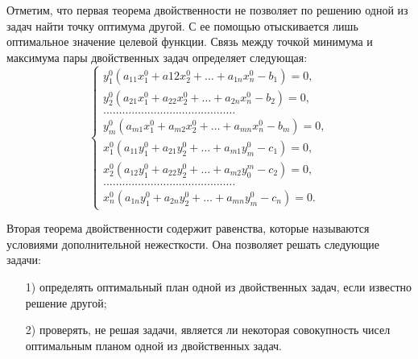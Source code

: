 Отметим, что первая теорема двойственности не позволяет по решению одной из задач найти точку оптимума другой. С ее помощью отыскивается лишь оптимальное значение целевой функции. Связь между точкой минимума и максимума пары двойственных задач определяет следующая:\\

\[
\begin{cases}
y^0_1\left(a_{11}x^0_1 + a{12}x^0_2 + \ldots + a_{1n}x^0_n - b_1\right) = 0, \\
y^0_2\left(a_{21}x^0_1 + a_{22}x^0_2 + \ldots + a_{2n}x^0_n - b_2\right) = 0, \\
\ldots\ldots\ldots\ldots\ldots\ldots\ldots\ldots\ldots\ldots\ldots\ldots\ldots\ldots \\
y^0_m\left(a_{m1}x^0_1 + a_{m2}x^0_2 + \ldots + a_{mn}x^0_n - b_m\right) = 0, \\
x^0_1\left(a_{11}y^0_1 + a_{21}y^0_2 + \ldots + a_{m1}y^0_m - c_1\right) = 0, \\
x^0_2\left(a_{12}y^0_1 + a_{22}y^0_2 + \ldots + a_{m2}y^m_0 - c_2\right) = 0, \\
\ldots\ldots\ldots\ldots\ldots\ldots\ldots\ldots\ldots\ldots\ldots\ldots\ldots\ldots \\
x^0_n\left(a_{1n}y^0_1 + a_{2n}y^0_2 + \ldots + a_{mn}y^0_m - c_n\right) = 0.
\end{cases}
\]

Вторая теорема двойственности содержит равенства, которые называются условиями дополнительной нежесткости. Она позволяет решать следующие задачи:
\begin{enumerate}
\item[1)] определять оптимальный план одной из двойственных задач, если известно решение другой;
\item[2)] проверять, не решая задачи, является ли некоторая совокупность чисел оптимальным планом одной из двойственных задач.
\end{enumerate}

